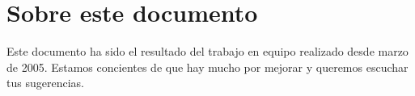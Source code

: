 \chapter*{Sobre este documento}\label{chap:lessons}
%

Este documento ha sido el resultado del trabajo en equipo realizado desde marzo de 2005.
Estamos concientes de que hay mucho por mejorar y queremos escuchar tus sugerencias.

%
%

